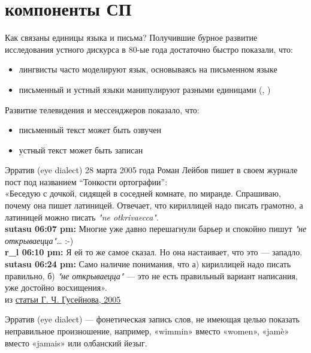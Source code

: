 \section{компоненты СП}
\begin{frame}{Как связаны единицы языка и письма?}
Получившие бурное развитие исследования устного дискурса в 80-ые года достаточно быстро показали, что:
\begin{itemize}
\item лингвисты часто моделируют язык, основываясь на письменном языке
\item письменный и устный языки манипулируют разными единицами (\citep{wackernagel71}, \citep{foster00})
 \end{itemize}
Развитие телевидения и мессенджеров показало, что:
\begin{itemize}
\item письменный текст может быть озвучен
\item устный текст может быть записан
\end{itemize}
\end{frame}
\begin{frame}{Эрратив (eye dialect)}
28 марта 2005 года Роман Лейбов пишет в своем журнале пост под названием ``Тонкости ортографии'':\\
«Беседую с дочкой, сидящей в соседней комнате, по миранде. Спрашиваю, почему она пишет латиницей. Отвечает, что кириллицей надо писать грамотно, а латиницей можно писать \textit{"ne otkrivaecca"}.\\
\textbf{sutasu 06:07 pm:} Многие уже давно перешагнули барьер и спокойно пишут \textit{"не открываецца"}… :-)\\
\textbf{r\_l 06:10 pm:} Я ей то же самое сказал. Но она настаивает, что это — западло.\\
\textbf{sutasu 06:24 pm:} Само наличие понимания, что а) кириллицей надо писать правильно, б) \textit{"не открываецца"} —  это не есть правильный вариант написания, уже достойно восхищения».\\
\hfill из \href{http://www.speakrus.ru/gg/microprosa_erratica-1.htm}{статьи Г. Ч. Гусейнова, 2005}
\end{frame}
\begin{frame}{Эрратив (eye dialect)}
— фонетическая запись слов, не имеющая целью показать неправильное произношение, например, «wimmin» вместо «women», «jamè» вместо «jamais» или олбанский йезыг.
\end{frame}
